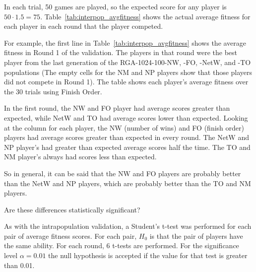 In each trial, 50 games are played, so the expected score for any player is \(50
\cdot 1.5 = 75\). Table~\ref{tab:interpop_avgfitness} shows the actual average
fitness for each player in each round that the player competed.

For example, the first line in Table~\ref{tab:interpop_avgfitness} shows the
average fitness in Round 1 of the validation. The players in that round were the
best player from the last generation of the RGA-1024-100-NW, -FO, -NetW, and -TO
populations (The empty cells for the NM and NP players show that those players
did not compete in Round 1). The table shows each player's average fitness over
the 30 trials using Finish Order.

In the first round, the NW and FO player had average scores greater than
expected, while NetW and TO had average scores lower than expected. Looking at
the column for each player, the NW (number of wins) and FO (finish order)
players had average scores greater than expected in every round. The NetW and NP
player's had greater than expected average scores half the time. The TO and NM
player's always had scores less than expected.

So in general, it can be said that the NW and FO players are probably better
than the NetW and NP players, which are probably better than the TO and NM
players.

Are these differences statistically significant?

As with the intrapopulation validation, a Student's t-test was performed for
each pair of average fitness scores. For each pair, $H_{0}$ is that the pair of
players have the same ability. For each round, 6 t-tests are performed. For the
significance level \(\alpha=0.01\) the null hypothesis is accepted if the
value for that test is greater than 0.01. 

